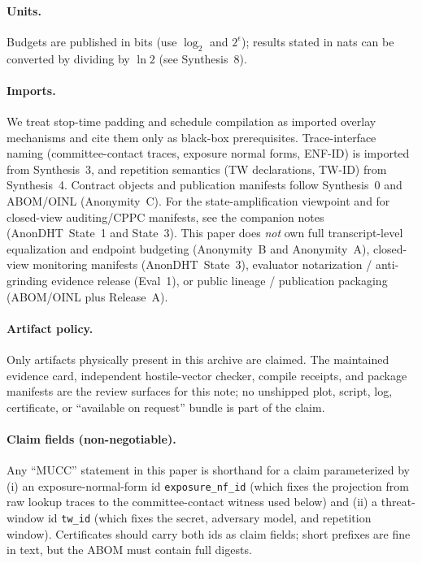 \documentclass[11pt]{article}
\begin{document}
\paragraph{Units.} Budgets are published in bits (use $\log_2$ and $2^{\epsilon}$); results stated in nats can be converted by dividing by $\ln 2$ (see Synthesis~8).\cite{series:notation}

\paragraph{Imports.}
We treat stop-time padding and schedule compilation as imported overlay mechanisms and cite them only as black-box prerequisites.\cite{series:stoptimeaddendum,series:schedcompiler}
Trace-interface naming (committee-contact traces, exposure normal forms, ENF-ID) is imported from Synthesis~3, and repetition semantics (TW declarations, TW-ID) from Synthesis~4.\cite{series:traceifaces,series:threatwindows}
Contract objects and publication manifests follow Synthesis~0 and ABOM/OINL (Anonymity~C).\cite{series:contractobjects,series:abomoinl}
For the state-amplification viewpoint and for closed-view auditing/CPPC manifests, see the companion notes (AnonDHT~State~1 and State~3).\cite{series:state1,series:state3}
This paper does \emph{not} own full transcript-level equalization and endpoint budgeting (Anonymity~B and Anonymity~A), closed-view monitoring manifests (AnonDHT~State~3), evaluator notarization / anti-grinding evidence release (Eval~1), or public lineage / publication packaging (ABOM/OINL plus Release~A).\cite{series:profiling,series:oddsinflation,series:state3,series:evalnotary,series:abomoinl,series:release}

\paragraph{Artifact policy.}
Only artifacts physically present in this archive are claimed.  The maintained evidence card, independent hostile-vector checker, compile receipts, and package manifests are the review surfaces for this note; no unshipped plot, script, log, certificate, or ``available on request'' bundle is part of the claim.

\paragraph{Claim fields (non-negotiable).}
Any ``MUCC'' statement in this paper is shorthand for a claim parameterized by
(i) an exposure-normal-form id \texttt{exposure\_nf\_id} (which fixes the projection from raw lookup traces to the committee-contact witness used below) and
(ii) a threat-window id \texttt{tw\_id} (which fixes the secret, adversary model, and repetition window).
Certificates should carry both ids as claim fields; short prefixes are fine in text, but the ABOM must contain full digests.
\end{document}
